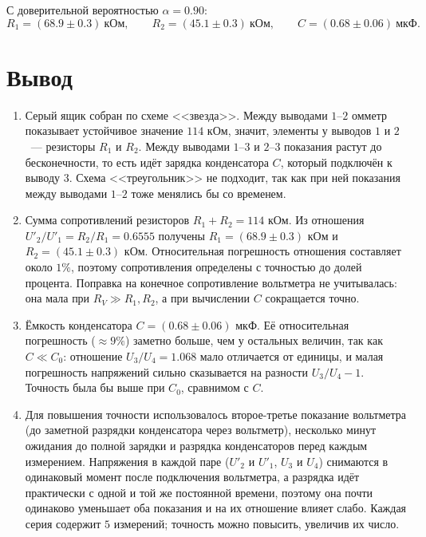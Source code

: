 \documentclass[12pt]{article}
\begin{document}
    С доверительной вероятностью $\alpha = 0.90$:
    \[
        R_1 = (68.9 \pm 0.3) \ \text{кОм}, \qquad R_2 = (45.1 \pm 0.3) \ \text{кОм}, \qquad C = (0.68 \pm 0.06) \ \text{мкФ}.
    \]

    \section{Вывод}

    \begin{enumerate}
        \item Серый ящик собран по схеме <<звезда>>. Между выводами $1$--$2$ омметр показывает устойчивое значение $114$ кОм, значит, элементы у выводов $1$ и $2$~--- резисторы $R_1$ и $R_2$. Между выводами $1$--$3$ и $2$--$3$ показания растут до бесконечности, то есть идёт зарядка конденсатора $C$, который подключён к выводу $3$. Схема <<треугольник>> не подходит, так как при ней показания между выводами $1$--$2$ тоже менялись бы со временем.

        \item Сумма сопротивлений резисторов $R_1 + R_2 = 114$ кОм. Из отношения $U'_2 / U'_1 = R_2 / R_1 = 0.6555$ получены $R_1 = (68.9 \pm 0.3)$ кОм и $R_2 = (45.1 \pm 0.3)$ кОм. Относительная погрешность отношения составляет около $1\%$, поэтому сопротивления определены с точностью до долей процента. Поправка на конечное сопротивление вольтметра не учитывалась: она мала при $R_V \gg R_1, R_2$, а при вычислении $C$ сокращается точно.

        \item Ёмкость конденсатора $C = (0.68 \pm 0.06)$ мкФ. Её относительная погрешность ($\approx 9\%$) заметно больше, чем у остальных величин, так как $C \ll C_0$: отношение $U_3 / U_4 = 1.068$ мало отличается от единицы, и малая погрешность напряжений сильно сказывается на разности $U_3 / U_4 - 1$. Точность была бы выше при $C_0$, сравнимом с $C$.

        \item Для повышения точности использовалось второе-третье показание вольтметра (до заметной разрядки конденсатора через вольтметр), несколько минут ожидания до полной зарядки и разрядка конденсаторов перед каждым измерением. Напряжения в каждой паре ($U'_2$ и $U'_1$, $U_3$ и $U_4$) снимаются в одинаковый момент после подключения вольтметра, а разрядка идёт практически с одной и той же постоянной времени, поэтому она почти одинаково уменьшает оба показания и на их отношение влияет слабо. Каждая серия содержит $5$ измерений; точность можно повысить, увеличив их число.
    \end{enumerate}
\end{document}
